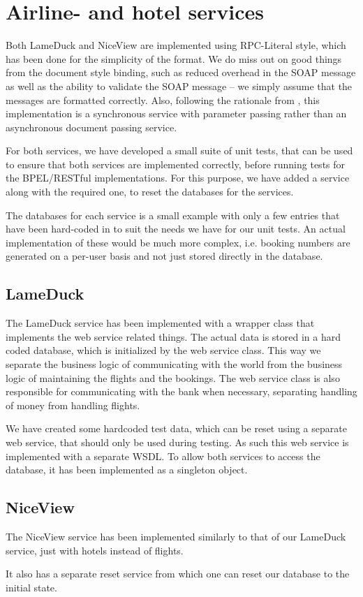 \section{Airline- and hotel services}
Both LameDuck and NiceView are implemented using RPC-Literal style, which has been done for the simplicity of the format. We do miss out on good things from the document style binding, such as reduced overhead in the SOAP message as well as the ability to validate the SOAP message -- we simply assume that the messages are formatted correctly. 
Also, following the rationale from \cite{papazoglou2008web}, this implementation is a synchronous service with parameter passing rather than an asynchronous document passing service.

For both services, we have developed a small suite of unit tests, that can be used to ensure that both services are implemented correctly, before running tests for the BPEL/RESTful implementations. For this purpose, we have added a service along with the required one, to reset the databases for the services.

The databases for each service is a small example with only a few entries that have been hard-coded in to suit the needs we have for our unit tests. An actual implementation of these would be much more complex, i.e. booking numbers are generated on a per-user basis and not just stored directly in the database.

\subsection{LameDuck}
The LameDuck service has been implemented with a wrapper class that implements the web service related things. The actual data is stored in a hard coded database, which is initialized by the web service class. This way we separate the business logic of communicating with the world from the business logic of maintaining the flights and the bookings. The web service class is also responsible for communicating with the bank when necessary, separating handling of money from handling flights.

We have created some hardcoded test data, which can be reset using a separate web service, that should only be used during testing. As such this web service is implemented with a separate WSDL. To allow both services to access the database, it has been implemented as a singleton object.


\subsection{NiceView}
The NiceView service has been implemented similarly to that of our LameDuck service, just with hotels instead of flights.

It also has a separate reset service from which one can reset our database to the initial state.


